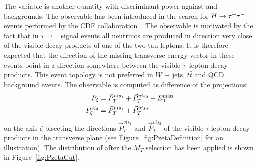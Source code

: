 
The \Pzeta variable is another quantity with discriminant power against \WpJets
and \ttbar backgrounds.  The observable has been introduced in the search for
$H\to\tau^+\tau^-$ events performed by the CDF collaboration~\cite{CDFrefPzeta}.  The
observable is motivated by the fact that in $\tau^+\tau^-$ signal events all neutrinos
are produced in direction very close of the visible decay products of one of the
two tau leptons. It is therefore expected that the direction of the missing
transverse energy vector in these events point in a direction somewhere between
the visible $\tau$--lepton decay products. This event topology is not preferred
in $W$ + jets, $t\bar{t}$ and QCD background events.  The observable is computed
as difference of the projections:
\begin{eqnarray}
P_{\zeta} &= \vec{P}_{T}^{vis_{1}} + \vec{P}_{T}^{vis_{2}} + E_{\mathrm{T}}^{\text{miss}} \nonumber \\
P_{\zeta}^{vis} &= \vec{P}_{T}^{vis_{1}} + \vec{P}_{T}^{vis_{2}} 
\label{eq:PZetaEq}
\end{eqnarray}
on the axis $\zeta$ bisecting the directions $\vec{P}_{T}^{vis_{1}}$ and
$\vec{P}_{T}^{vis_{2}}$ of the visible $\tau$ lepton decay products in the
transverse plane (see Figure~\ref{fig:PzetaDefinition} for an illustration).
The distribution of \Pzeta after the $M_T$ selection has been applied is shown
in Figure~\ref{fig:PzetaCut}.

